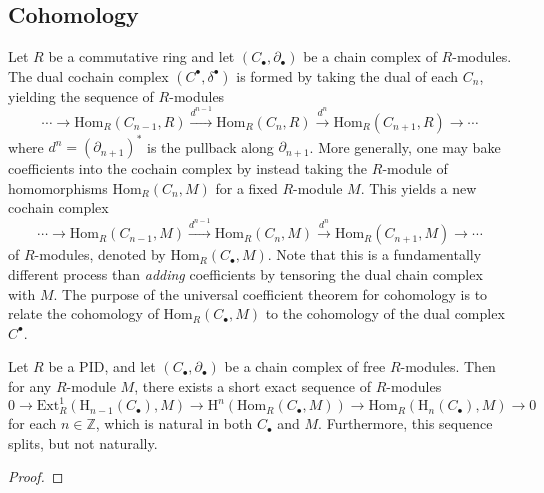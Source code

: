 \subsection{Cohomology}

Let $R$ be a commutative ring and let $(C_\bullet, \partial_\bullet)$ be a chain complex of $R$-modules. The dual cochain complex $(C^\bullet, \delta^\bullet)$ is formed by taking the dual of each $C_n$, yielding the sequence of $R$-modules
\begin{equation*}
    \cdots \to \mathrm{Hom}_R(C_{n-1}, R) \xrightarrow{d^{n-1}} \mathrm{Hom}_R(C_n, R) \xrightarrow{d^n} \mathrm{Hom}_R(C_{n+1}, R) \to \cdots
\end{equation*}
where $d^n = (\partial_{n+1})^*$ is the pullback along $\partial_{n+1}$. More generally, one may bake coefficients into the cochain complex by instead taking the $R$-module of homomorphisms $\mathrm{Hom}_R(C_n, M)$ for a fixed $R$-module $M$. This yields a new cochain complex
\begin{equation*}
    \cdots \to \mathrm{Hom}_R(C_{n-1}, M) \xrightarrow{d^{n-1}} \mathrm{Hom}_R(C_n, M) \xrightarrow{d^n} \mathrm{Hom}_R(C_{n+1}, M) \to \cdots
\end{equation*}
of $R$-modules, denoted by $\mathrm{Hom}_R(C_\bullet, M)$. Note that this is a fundamentally different process than \emph{adding} coefficients by tensoring the dual chain complex with $M$. The purpose of the universal coefficient theorem for cohomology is to relate the cohomology of $\mathrm{Hom}_R(C_\bullet, M)$ to the cohomology of the dual complex $C^\bullet$.

\begin{theorem}
    Let $R$ be a PID, and let $(C_\bullet, \partial_\bullet)$ be a chain complex of free $R$-modules. Then for any $R$-module $M$, there exists a short exact sequence of $R$-modules 
    \begin{equation*}
        0 \to \mathrm{Ext}_R^1(\mathrm{H}_{n-1}(C_\bullet), M) \to \mathrm{H}^n(\mathrm{Hom}_R(C_\bullet, M)) \to \mathrm{Hom}_R(\mathrm{H}_n(C_\bullet), M) \to 0
    \end{equation*}
    for each $n \in \mathbb{Z}$, which is natural in both $C_\bullet$ and $M$. Furthermore, this sequence splits, but not naturally.
\end{theorem}

\begin{proof}
\end{proof}